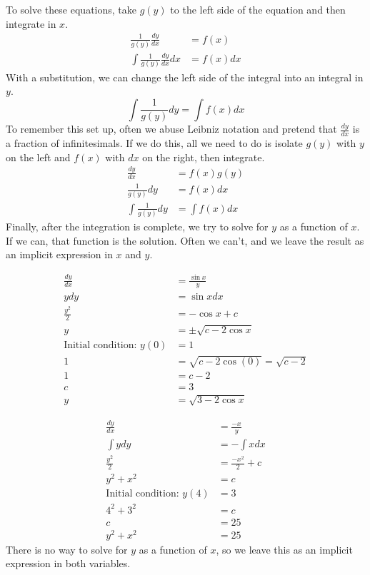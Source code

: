 \documentclass[fleqn]{report}
\begin{document}
To solve these equations, take $g(y)$ to the left side of the
equation and then integrate in $x$.
\begin{align*}
\frac{1}{g(y)} \frac{dy}{dx} & = f(x) \\
\int \frac{1}{g(y)} \frac{dy}{dx} dx & = f(x) dx 
\end{align*}
With a substitution, we can change the left side of the
integral into an integral in $y$.
\begin{equation*}
\int \frac{1}{g(y)} dy = \int f(x) dx
\end{equation*}
To remember this set up, often we abuse
Leibniz notation and pretend that $\frac{dy}{dx}$ is a
fraction of infinitesimals. If we do this, all we need to do is
isolate $g(y)$ with $y$ on the left and $f(x)$ with $dx$ on
the right, then integrate.
\begin{align*}
\frac{dy}{dx} & = f(x) g(y) \\
\frac{1}{g(y)} dy & = f(x) dx \\
\int \frac{1}{g(y)} dy & = \int f(x) dx
\end{align*}
Finally, after the integration is complete, we try to solve
for $y$ as a function of $x$. If we can, that function is the
solution. Often we can't, and we leave the result as an
implicit expression in $x$ and $y$. 

\begin{example}
\begin{align*}
\frac{dy}{dx} & = \frac{\sin x}{y} \\
y dy & = \sin x dx \\
\frac{y^2}{2} & = - \cos x + c \\
y & = \pm \sqrt{c - 2\cos x} \\
\text{Initial condition: } y(0) & = 1 \\
1 & = \sqrt{c - 2 \cos (0)} = \sqrt{c-2}\\
1 & = c-2 \\
c & = 3 \\
y & = \sqrt{3 - 2 \cos x} 
\end{align*}
\end{example}

\begin{example}
\begin{align*}
\frac{dy}{dx} & = \frac{-x}{y} \\
\int y dy & = - \int x dx \\
\frac{y^2}{2} & = \frac{-x^2}{2} + c \\
y^2 + x^2 & = c \\
\text{Initial condition: } y(4) & = 3 \\
4^2 + 3^2 & = c \\
c & = 25 \\
y^2 + x^2 & = 25
\end{align*}
There is no way to solve for $y$ as a function of $x$, so we
leave this as an implicit expression in both variables.
\end{example}
\end{document}
